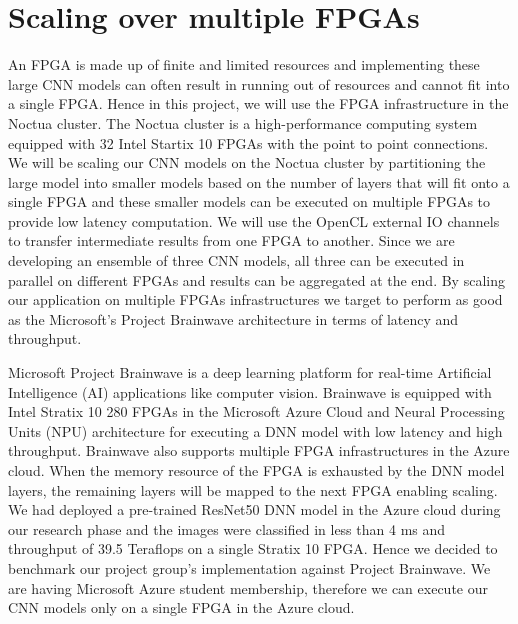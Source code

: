 \documentclass[titlepage]{report}
\begin{document}
\section{Scaling over multiple FPGAs}
An FPGA is made up of finite and limited resources and implementing these large CNN models can often result in running out of resources and cannot fit into a single FPGA. Hence in this project, we will use the FPGA infrastructure in the Noctua cluster. The Noctua cluster is a high-performance computing system equipped with 32 Intel Startix 10 FPGAs with the point to point connections. We will be scaling our CNN models on the Noctua cluster by partitioning the large model into smaller models based on the number of layers that will fit onto a single FPGA and these smaller models can be executed on multiple FPGAs to provide low latency computation. We will use the OpenCL external IO channels to transfer intermediate results from one FPGA to another. Since we are developing an ensemble of three CNN models, all three can be executed in parallel on different FPGAs and results can be aggregated at the end. By scaling our application on multiple FPGAs infrastructures we target to perform as good as the Microsoft's Project Brainwave architecture in terms of latency and throughput.
\par
Microsoft Project Brainwave is a deep learning platform for real-time Artificial Intelligence (AI) applications like computer vision. Brainwave is equipped with Intel Stratix 10 280 FPGAs in the Microsoft Azure Cloud and Neural Processing Units (NPU) architecture for executing a DNN model with low latency and high throughput. Brainwave also supports multiple FPGA infrastructures in the Azure cloud. When the memory resource of the FPGA is exhausted by the DNN model layers, the remaining layers will be mapped to the next FPGA enabling scaling. We had deployed a pre-trained ResNet50 DNN model in the Azure cloud during our research phase and the images were classified in less than 4 ms and throughput of 39.5 Teraflops on a single Stratix 10 FPGA. Hence we decided to benchmark our project group's implementation against Project Brainwave. We are having Microsoft Azure student membership, therefore we can execute our CNN models only on a single FPGA in the Azure cloud.
\end{document}
